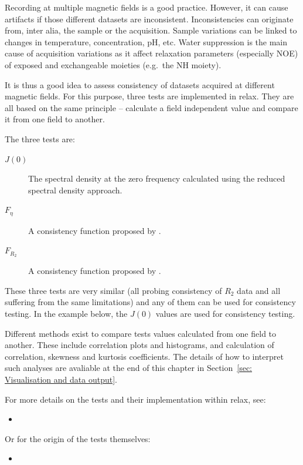 Recording at multiple magnetic fields is a good practice.
However, it can cause artifacts if those different datasets are inconsistent.
Inconsistencies can originate from, inter alia, the sample or the acquisition.
Sample variations can be linked to changes in temperature, concentration, pH, etc.
Water suppression is the main cause of acquisition variations as it affect relaxation parameters (especially NOE) of exposed and exchangeable moieties (e.g.\ the NH moiety).

It is thus a good idea to assess consistency of datasets acquired at different magnetic fields.
For this purpose, three tests are implemented in relax.
They are all based on the same principle -- calculate a field independent value and compare it from one field to another.

The three tests are:
\begin{description}
  \item[$J(0)$]  The spectral density at the zero frequency calculated using the reduced spectral density approach.
  \item[$F_\eta$]  A consistency function proposed by \citet{Fushman98}.
  \item[$F_{R_2}$]  A consistency function proposed by \citet{Fushman98}.
\end{description}

These three tests are very similar (all probing consistency of $R_2$ data and all suffering from the same limitations) and any of them can be used for consistency testing.
In the example below, the $J(0)$ values are used for consistency testing.

Different methods exist to compare tests values calculated from one field to another.
These include correlation plots and histograms, and calculation of correlation, skewness and kurtosis coefficients.
The details of how to interpret such analyses are avaliable at the end of this chapter in Section~\ref{sec: Visualisation and data output}.

For more details on the tests and their implementation within relax, see:
\begin{itemize}
  \item {}
\end{itemize}

Or for the origin of the tests themselves:
\begin{itemize}
  \item {}
\end{itemize}


